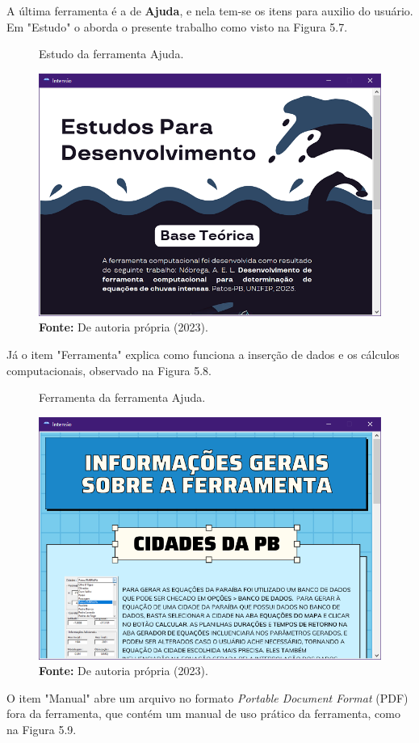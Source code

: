 A última ferramenta é a de \textbf{Ajuda}, e nela tem-se os itens para auxilio do usuário. Em "Estudo" o aborda o presente trabalho como visto na Figura 5.7.

\begin{figure}[!ht]
	\centering
	\caption{Estudo da ferramenta Ajuda.}
	\includegraphics[width=.7625\linewidth]{figuras/estudo.png}
	\caption*{\textbf{Fonte:} De autoria própria (2023).}
	\label{fig:figuras/estudo.png}
\end{figure}

Já o item "Ferramenta" explica como funciona a inserção de dados e os cálculos computacionais, observado na Figura 5.8.

\begin{figure}[!ht]
	\centering
	\caption{Ferramenta da ferramenta Ajuda.}
	\includegraphics[width=.7625\linewidth]{figuras/ferramenta.png}
	\caption*{\textbf{Fonte:} De autoria própria (2023).}
	\label{fig:figuras/ferramenta.png}
\end{figure}

\newpage

O item "Manual" abre um arquivo no formato \textit{Portable Document Format} (PDF) fora da ferramenta, que contém um manual de uso prático da ferramenta, como na Figura 5.9.

